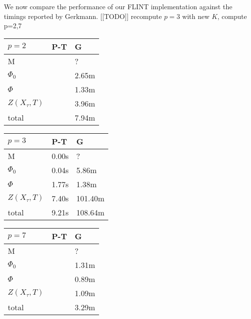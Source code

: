 \documentclass[a4paper,11pt]{article}
\numberwithin{equation}{section}
\theoremstyle{definition}
\begin{document}
We now compare the performance of our FLINT implementation against the 
timings reported by Gerkmann. [[TODO]] recompute $p=3$ with new $K$, 
compute p=2,7 \\ 

\begin{tabular}{l|l|l}
$p=2$            & \mbox{P-T} & \mbox{G}           \\
\hline                 
M                &              & ?                \\
\hline                 
$\Phi_0$         &              & 2.65m            \\
\hline                 
$\Phi$           &              & 1.33m            \\
\hline
$Z(X_{\tau},T)$  &              & 3.96m            \\
\hline
total            &              & 7.94m            \\
\end{tabular}
\quad
\begin{tabular}{l|l|l}
$p=3$            & \mbox{P-T} & \mbox{G} \\
\hline                 
M                & 0.00s        & ?               \\
\hline                 
$\Phi_0$         & 0.04s        & 5.86m           \\
\hline                 
$\Phi$           & 1.77s        & 1.38m           \\
\hline
$Z(X_{\tau},T)$  & 7.40s        & 101.40m         \\
\hline
total            & 9.21s        & 108.64m         \\
\end{tabular}
\quad
\begin{tabular}{l|l|l}
$p=7$            & \mbox{P-T} & \mbox{G}          \\
\hline                 
M                &              & ?               \\
\hline                 
$\Phi_0$         &              & 1.31m           \\
\hline                 
$\Phi$           &              & 0.89m           \\
\hline
$Z(X_{\tau},T)$  &              & 1.09m           \\
\hline
total            &              & 3.29m           \\
\end{tabular} \\
\end{document}
